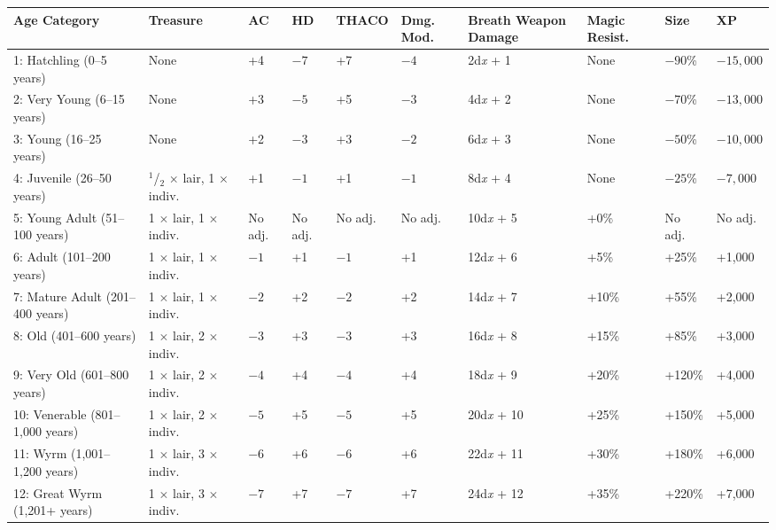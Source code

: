 \noindent \begin{minipage}{\columnwidth}

\label{dragonages}
\noindent \begin{tabular}{|p{}|p{}|p{}|p{}|p{}|p{}|p{}|p{}|p{}|p{}|}
\hline
Age Category	& Treasure	& AC	& HD	& THACO	& Dmg. Mod.	& Breath Weap\-on Damage	& Magic Resist.	& Size	& XP	\\
\hline\hline
\rowcolor[gray]{.9}1: Hatchling (0--5 years)	& None	& +4	& $-7$	& +7	& $-4$	& 2d\textit{x} + 1	& None	& $-90$\%	& $-15,000$	\\
2: Very Young (6--15 years)	& None	& +3	& $-5$	& +5	& $-3$	& 4d\textit{x} + 2	& None	& $-70$\%	& $-13,000$	\\
\rowcolor[gray]{.9}3: Young (16--25 years)		& None	& +2	& $-3$	& +3	& $-2$	& 6d\textit{x} + 3	& None	& $-50$\%	& $-10,000$	\\
4: Juvenile (26--50 years)	& $^1$/$_2$ $\times$ lair, 1 $\times$ indiv.	& +1	& $-1$	& +1	& $-1$	& 8d\textit{x} + 4	& None	& $-25$\%	& $-7,000$	\\
\rowcolor[gray]{.9}5: Young Adult (51--100 years)	& 1 $\times$ lair, 1 $\times$ indiv.	& No adj.	& No adj.	& No adj.	& No adj.	& 10d\textit{x} + 5	& +0\%	& No adj.	& No adj.	\\
6: Adult (101--200 years)	& 1 $\times$ lair, 1 $\times$ indiv.	& $-1$	& +1	& $-1$	& +1	& 12d\textit{x} + 6	& +5\%	& +25\%	& +1,000	\\
\rowcolor[gray]{.9}7: Mature Adult (201--400 years)	& 1 $\times$ lair, 1 $\times$ indiv.	& $-2$	& +2	& $-2$	& +2	& 14d\textit{x} + 7	& +10\%	& +55\%	& +2,000	\\
8: Old (401--600 years)	& 1 $\times$ lair, 2 $\times$ indiv.	& $-3$	& +3	& $-3$	& +3	& 16d\textit{x} + 8	& +15\%	& +85\%	& +3,000	\\
\rowcolor[gray]{.9}9: Very Old (601--800 years)	& 1 $\times$ lair, 2 $\times$ indiv.	& $-4$	& +4	& $-4$	& +4	& 18d\textit{x} + 9	& +20\%	& +120\%	& +4,000	\\
10: Venerable (801--1,000 years)	& 1 $\times$ lair, 2 $\times$ indiv.	& $-5$	& +5	& $-5$	& +5	& 20d\textit{x} + 10	& +25\%	& +150\%	& +5,000	\\
\rowcolor[gray]{.9}11: Wyrm (1,001--1,200 years)	& 1 $\times$ lair, 3 $\times$ indiv.	& $-6$	& +6	& $-6$	& +6	& 22d\textit{x} + 11	& +30\%	& +180\%	& +6,000	\\
12: Great Wyrm (1,201+ years)	& 1 $\times$ lair, 3 $\times$ indiv.	& $-7$	& +7	& $-7$	& +7	& 24d\textit{x} + 12	& +35\%	& +220\%	& +7,000	\\
\hline
\end{tabular}

\end{minipage}

